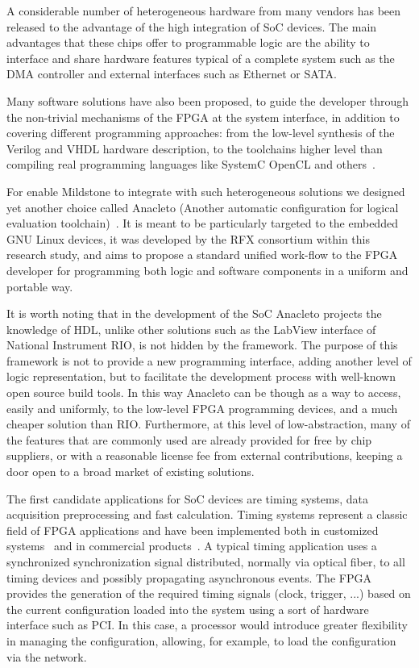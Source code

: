 A considerable number of heterogeneous hardware from many vendors has been released to the advantage of the high integration of SoC devices. The main advantages that these chips offer to programmable logic are the ability to interface and share hardware features typical of a complete system such as the DMA controller and external interfaces such as Ethernet or SATA.

Many software solutions have also been proposed, to guide the developer through the non-trivial mechanisms of the FPGA at the system interface, in addition to covering different programming approaches: from the low-level synthesis of the Verilog and VHDL hardware description, to the toolchains higher level than compiling real programming languages like SystemC OpenCL and others~\cite{ana_7,ana_8}.

For enable Mildstone to integrate with such heterogeneous solutions we designed yet another choice called Anacleto (Another automatic configuration for logical evaluation toolchain)~\cite{RIGONI2018122}. It is meant to be particularly targeted to the embedded GNU Linux devices, it was developed by the RFX consortium within this research study, and aims to propose a standard unified work-flow to the FPGA developer for programming both logic and software components in a uniform and portable way.

It is worth noting that in the development of the SoC Anacleto projects the knowledge of HDL, unlike other solutions such as the LabView interface of National Instrument RIO, is not hidden by the framework. The purpose of this framework is not to provide a new programming interface, adding another level of logic representation, but to facilitate the development process with well-known open source build tools. In this way Anacleto can be though as a way to access, easily and uniformly, to the low-level FPGA programming devices, and a much cheaper solution than RIO. Furthermore, at this level of low-abstraction, many of the features that are commonly used are already provided for free by chip suppliers, or with a reasonable license fee from external contributions, keeping a door open to a broad market of existing solutions.

The first candidate applications for SoC devices are timing systems, data acquisition preprocessing and fast calculation. Timing systems represent a classic field of FPGA applications and have been implemented both in customized systems~\cite{ana_9} and in commercial products~\cite{ana_10}. A typical timing application uses a synchronized synchronization signal distributed, normally via optical fiber, to all timing devices and possibly propagating asynchronous events. The FPGA provides the generation of the required timing signals (clock, trigger, ...) based on the current configuration loaded into the system using a sort of hardware interface such as PCI. In this case, a processor would introduce greater flexibility in managing the configuration, allowing, for example, to load the configuration via the network.

